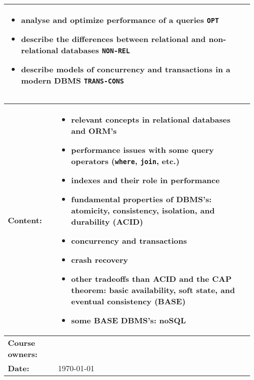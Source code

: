 \begin{tabularx}{\textwidth}{|>{\columncolor{lichtGrijs}} p{}|X|}
\begin{itemize}
				\item \textbf{analyse} and optimize performance of a queries \texttt{OPT}
				\item \textbf{describe} the differences between relational and non-relational databases \texttt{NON-REL}

				\item \textbf{describe} models of concurrency and transactions in a modern DBMS \texttt{TRANS-CONS}

			\end{itemize} \\
		
	\hline
\end{tabularx}
\newpage

\begin{tabularx}{\textwidth}{|>{\columncolor{lichtGrijs}} p{}|X|}
	\hline
	\textbf{Content:}&
	\begin{itemize}
		\item relevant concepts in relational databases and ORM's
		\item performance issues with some query operators (\texttt{where}, \texttt{join}, etc.)
		\item indexes and their role in performance
		\item fundamental properties of DBMS's: atomicity, consistency, isolation, and durability (ACID)
		\item concurrency and transactions
		\item crash recovery
		\item other tradeoffs than ACID and the CAP theorem: basic availability, soft state, and eventual consistency (BASE)
		\item some BASE DBMS's: noSQL
	\end{itemize} \\
	\hline
	\textbf{Course owners:} & \author\\
	\hline
	\textbf{Date:} & \today \\
	\hline
\end{tabularx}
\newpage
